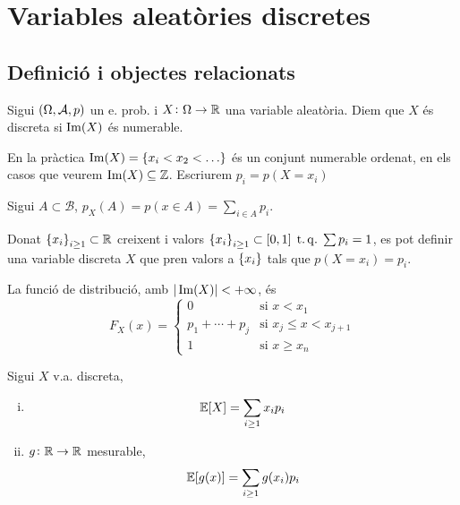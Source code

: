 \chapter{Variables aleatòries discretes}

\section[Definició i objectes relacionats]
    {Definició i objectes relacionats
    }

\begin{defi}
    Sigui $\left( \Omega, \mathcal{A}, p\right)$ un e. prob. i $X\colon \Omega\to\mathbb{R}$ una variable aleatòria. Diem que $X$ és discreta si
    $\operatorname{Im}(X)$ és numerable.
\end{defi}

\begin{obs}
    En la pràctica $\im(X) = \lc x_i < x_2 < \dots \rc$ és un conjunt numerable ordenat, en els casos que veurem $\operatorname{Im}(X)\subseteq\mathbb{Z}$.
    Escriurem $p_i = p(X=x_i)$
\end{obs}

\begin{obs}
    Sigui $A\subset\mathcal{B}$, $p_X(A) = p(x\in A) = \sum_{i\in A}{p_i}$.
\end{obs}

\begin{obs}
    Donat $\left\{ x_i \right\}_{i \ge 1} \subset\mathbb{R}$ creixent i valors $\left\{ x_i \right\}_{i \ge 1} \subset [0,1] \operatorname{\;t.q.\;} \sum{p_i}=1$, es pot definir
    una variable discreta $X$ que pren valors a $\left\{ x_i \right\}$ tals que $p(X=x_i) = p_i$.
\end{obs}

\begin{obs}
    La funció de distribució, amb $|\operatorname{Im}(X)|<+\infty$, és
    \[F_X(x) = \begin{cases}
        0 &\text{si } x<x_1\\
        p_1+\cdots+p_j &\text{si } x_j \le x < x_{j+1}\\
        1 &\text{si } x \ge x_n
    \end{cases}\]
\end{obs}

\begin{prop} Sigui $X$ v.a. discreta,
    \begin{enumerate}[i)]
        \item \[\operatorname{\mathbb{E}}[X] = \sum_{i \ge 1}{x_i p_i}\]
        \item $g\colon \mathbb{R}\to\mathbb{R}$ mesurable, \[\operatorname{\mathbb{E}}[g(x)] = \sum_{i \ge 1}{g(x_i) p_i}\]
    \end{enumerate}
\end{prop}

